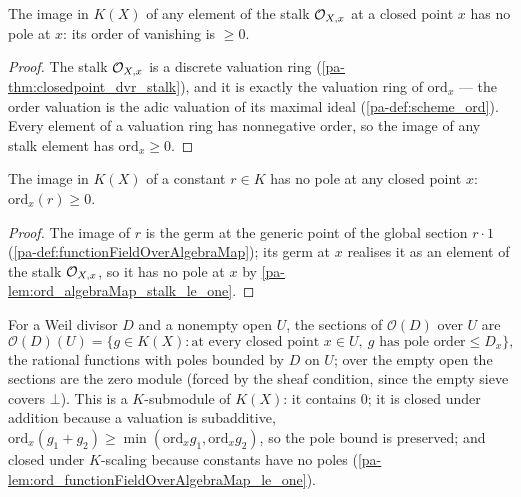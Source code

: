 \begin{lemma}
  \label{pa-lem:ord_algebraMap_stalk_le_one}
  \leanok

  The image in \(K(X)\) of any element of the stalk \(\mathcal{O}_{X,x}\) at a closed point \(x\) has no
  pole at \(x\): its order of vanishing is \(\ge 0\).
\end{lemma}
\begin{proof}
  \leanok
  The stalk \(\mathcal{O}_{X,x}\) is a discrete valuation ring (\ref{pa-thm:closedpoint_dvr_stalk}), and it
  is exactly the valuation ring of \(\mathrm{ord}_x\) --- the order valuation is the adic valuation
  of its maximal ideal (\ref{pa-def:scheme_ord}). Every element of a valuation ring has nonnegative
  order, so the image of any stalk element has \(\mathrm{ord}_x \ge 0\).
\end{proof}

\begin{lemma}
  \label{pa-lem:ord_functionFieldOverAlgebraMap_le_one}
  \leanok

  The image in \(K(X)\) of a constant \(r \in K\) has no pole at any closed point \(x\):
  \(\mathrm{ord}_x(r) \ge 0\).
\end{lemma}
\begin{proof}
  \leanok
  The image of \(r\) is the germ at the generic point of the global section \(r \cdot 1\)
  (\ref{pa-def:functionFieldOverAlgebraMap}); its germ at \(x\) realises it as an element of the stalk
  \(\mathcal{O}_{X,x}\), so it has no pole at \(x\) by \ref{pa-lem:ord_algebraMap_stalk_le_one}.
\end{proof}

\begin{definition}
  \label{pa-def:divisorSections}
  \leanok

  For a Weil divisor \(D\) and a nonempty open \(U\), the sections of \(\mathcal O(D)\) over \(U\)
  are
  \[
    \mathcal O(D)(U) = \{ g \in K(X) : \text{at every closed point } x \in U,\ g \text{ has pole
      order} \le D_x \},
  \]
  the rational functions with poles bounded by \(D\) on \(U\); over the empty open the sections are
  the zero module (forced by the sheaf condition, since the empty sieve covers \(\bot\)). This is a
  \(K\)-submodule of \(K(X)\): it contains \(0\); it is closed under addition because a valuation is
  subadditive, \(\mathrm{ord}_x(g_1 + g_2) \ge \min(\mathrm{ord}_x g_1, \mathrm{ord}_x g_2)\), so
  the pole bound is preserved; and closed under \(K\)-scaling because constants have no poles
  (\ref{pa-lem:ord_functionFieldOverAlgebraMap_le_one}).
\end{definition}

